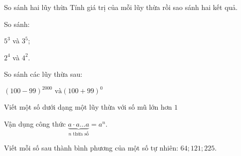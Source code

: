 \begin{dang}{So sánh hai lũy thừa}
Tính giá trị của mỗi lũy thừa rồi sao sánh hai kết quả.
\end{dang}
\begin{vd}%
	So sánh:
	\begin{enumEX}{2}
		\item $5^3$ và $3^5$;
		\item $2^4$ và $4^2$.	
	\end{enumEX}
\end{vd}
\begin{vd}%
	So sánh các lũy thừa sau:\\
	\centerline{$ \left( 100 - 99\right) ^{2000} \mbox{ và} \left( 100 + 99\right) ^0$}
\end{vd}
\begin{dang}{Viết một số dưới dạng một lũy thừa với số mũ lớn hơn $1$}
\centerline{Vận dụng công thức 	$\underbrace{a\cdot a\ldots a}_{n \mbox{ thừa số}}  = a^n$.}
\end{dang}
\begin{vd}%
	Viết mỗi số sau thành bình phương của một số tự nhiên: $64; 121; 225$.
		
\end{vd}
